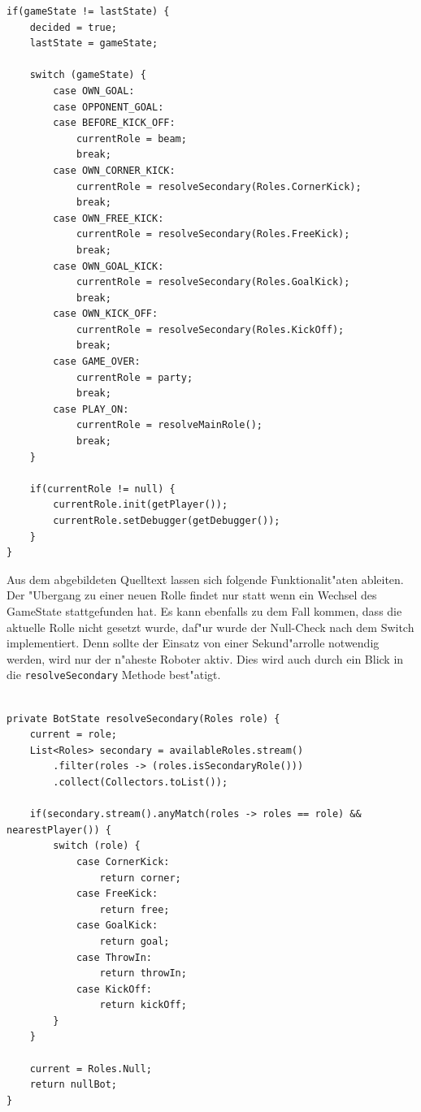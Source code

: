 \documentclass[fontsize=12pt,a4paper,final]{scrartcl}[2003/01/01]
\begin{document}
\begin{lstlisting}[caption=Entscheidung zu einer Rolle, captionpos=b, label=EntscheidungRolleStrategie]
if(gameState != lastState) {
    decided = true;
    lastState = gameState;

    switch (gameState) {
        case OWN_GOAL:
        case OPPONENT_GOAL:
        case BEFORE_KICK_OFF:
            currentRole = beam;
            break;
        case OWN_CORNER_KICK:
            currentRole = resolveSecondary(Roles.CornerKick);
            break;
        case OWN_FREE_KICK:
            currentRole = resolveSecondary(Roles.FreeKick);
            break;
        case OWN_GOAL_KICK:
            currentRole = resolveSecondary(Roles.GoalKick);
            break;
        case OWN_KICK_OFF:
            currentRole = resolveSecondary(Roles.KickOff);
            break;
        case GAME_OVER:
            currentRole = party;
            break;
        case PLAY_ON:
            currentRole = resolveMainRole();
            break;
    }

    if(currentRole != null) {
        currentRole.init(getPlayer());
        currentRole.setDebugger(getDebugger());
    }
}
\end{lstlisting}

Aus dem abgebildeten Quelltext lassen sich folgende Funktionalit"aten ableiten. Der "Ubergang zu einer neuen Rolle findet nur statt wenn ein Wechsel des GameState stattgefunden hat. Es kann ebenfalls zu dem Fall kommen, dass die aktuelle Rolle nicht gesetzt wurde, daf"ur wurde der Null-Check nach dem Switch implementiert. Denn sollte der Einsatz von einer Sekund"arrolle notwendig werden, wird nur der n"aheste Roboter aktiv. Dies wird auch durch ein Blick in die \lstinline$resolveSecondary$ Methode best"atigt.\\
\\
\begin{lstlisting}[caption=resolveSecondary Methode der Strategie, captionpos=b, label=EntscheidungRolleStrategie]
private BotState resolveSecondary(Roles role) {
    current = role;
    List<Roles> secondary = availableRoles.stream()
        .filter(roles -> (roles.isSecondaryRole()))
        .collect(Collectors.toList());

    if(secondary.stream().anyMatch(roles -> roles == role) && nearestPlayer()) {
        switch (role) {
            case CornerKick:
                return corner;
            case FreeKick:
                return free;
            case GoalKick:
                return goal;
            case ThrowIn:
                return throwIn;
            case KickOff:
                return kickOff;
        }
    }

    current = Roles.Null;
    return nullBot;
}
\end{lstlisting}
\end{document}
